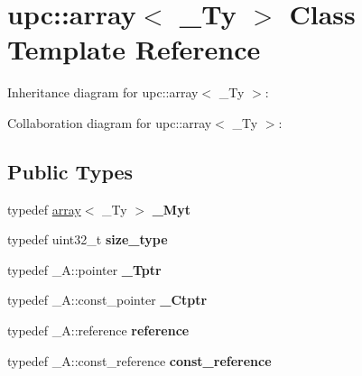 \hypertarget{classupc_1_1array}{}\section{upc\+:\+:array$<$ \+\_\+\+Ty $>$ Class Template Reference}
\label{classupc_1_1array}


Inheritance diagram for upc\+:\+:array$<$ \+\_\+\+Ty $>$\+:


Collaboration diagram for upc\+:\+:array$<$ \+\_\+\+Ty $>$\+:
\subsection*{Public Types}
\begin{DoxyCompactItemize}
\item 
\mbox{\label{classupc_1_1array_a9c800a9bf971fc1d7c02a34803f87115}} 
typedef \hyperlink{classupc_1_1array}{array}$<$ \+\_\+\+Ty $>$ {\bfseries \+\_\+\+Myt}
\item 
\mbox{\label{classupc_1_1array_a85501f086a20ed6686ef78a242b2f302}} 
typedef uint32\+\_\+t {\bfseries size\+\_\+type}
\item 
\mbox{\label{classupc_1_1array_a4ef66945898a2c393cff5be41de077d2}} 
typedef \+\_\+\+A\+::pointer {\bfseries \+\_\+\+Tptr}
\item 
\mbox{\label{classupc_1_1array_a420718228a4d845721303a19755f0d42}} 
typedef \+\_\+\+A\+::const\+\_\+pointer {\bfseries \+\_\+\+Ctptr}
\item 
\mbox{\label{classupc_1_1array_a99066373537d57ee780ce4d3396314f8}} 
typedef \+\_\+\+A\+::reference {\bfseries reference}
\item 
\mbox{\label{classupc_1_1array_a3b639eaadbf9a2c410d7c02d3d1c01e4}} 
typedef \+\_\+\+A\+::const\+\_\+reference {\bfseries const\+\_\+reference}
\end{DoxyCompactItemize}
